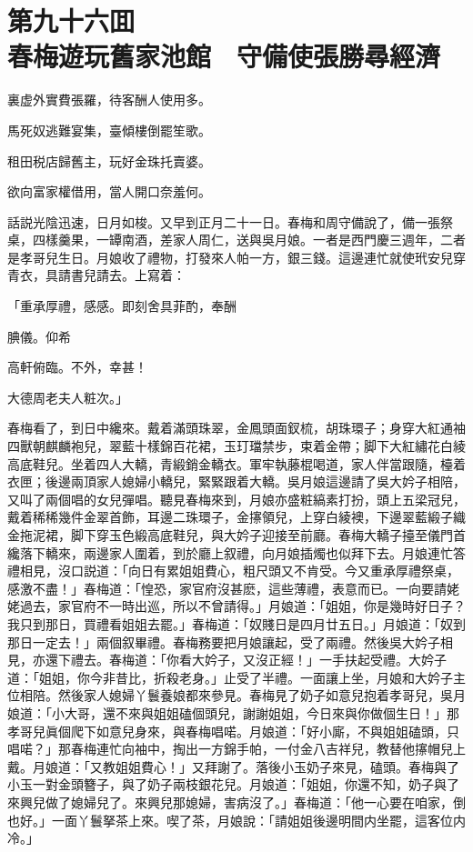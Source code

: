 
\chapter*{第九十六囬　\\春梅遊玩舊家池館　守備使張勝尋經濟}


\begin{myquote}
裏虚外實費張羅，待客酬人使用多。

馬死奴逃難宴集，臺傾樓倒罷笙歌。

租田税店歸舊主，玩好金珠托賣婆。

欲向富家權借用，當人開口奈羞何。
\end{myquote}

話説光陰迅速，日月如梭。又早到正月二十一日。春梅和周守備說了，備一張祭桌，四樣羹果，一罈南酒，差家人周仁，送與吳月娘。一者是西門慶三週年，二者是孝哥兒生日。月娘收了禮物，打發來人帕一方，銀三錢。這邊連忙就使玳安兒穿青衣，具請書兒請去。上寫着：

\begin{myquote}[\markfont]
「重承厚禮，感感。即刻舍具菲酌，奉酬

腆儀。仰希

高軒俯臨。不外，幸甚！


\raggedright{大德周老夫人粧次。」}
\end{myquote}

春梅看了，到日中纔來。戴着滿頭珠翠，金鳳頭面釵梳，胡珠環子；身穿大紅通袖四獸朝麒麟袍兒，翠藍十樣錦百花裙，玉玎璫禁步，束着金帶；脚下大紅繡花白綾高底鞋兒。坐着四人大轎，青緞銷金轎衣。軍牢執藤棍喝道，家人伴當跟隨，檯着衣匣；後邊兩頂家人媳婦小轎兒，緊緊跟着大轎。吳月娘這邊請了吳大妗子相陪，又叫了兩個唱的女兒彈唱。聽見春梅來到，月娘亦盛粧縞素打扮，頭上五梁冠兒，戴着稀稀幾件金翠首飾，耳邊二珠環子，金㩟領兒，上穿白綾襖，下邊翠藍緞子織金拖泥裙，脚下穿玉色緞高底鞋兒，與大妗子迎接至前廳。春梅大轎子擡至儀門首纔落下轎來，兩邊家人圍着，到於廳上叙禮，向月娘插燭也似拜下去。月娘連忙答禮相見，沒口説道：「向日有累姐姐費心，粗尺頭又不肯受。今又重承厚禮祭桌，感激不盡！」春梅道：「惶恐，家官府沒甚麽，這些薄禮，表意而已。一向要請姥姥過去，家官府不一時出巡，所以不曾請得。」月娘道：「姐姐，你是幾時好日子？我只到那日，買禮看姐姐去罷。」春梅道：「奴賤日是四月廿五日。」月娘道：「奴到那日一定去！」兩個叙畢禮。春梅務要把月娘讓起，受了兩禮。然後吳大妗子相見，亦還下禮去。春梅道：「你看大妗子，又沒正經！」一手扶起受禮。大妗子道：「姐姐，你今非昔比，折殺老身。」止受了半禮。一面讓上坐，月娘和大妗子主位相陪。然後家人媳婦丫鬟養娘都來參見。春梅見了奶子如意兒抱着孝哥兒，吳月娘道：「小大哥，還不來與姐姐磕個頭兒，謝謝姐姐，今日來與你做個生日！」那孝哥兒眞個爬下如意兒身來，與春梅唱喏。月娘道：「好小廝，不與姐姐磕頭，只唱喏？」那春梅連忙向袖中，掏出一方錦手帕，一付金八吉祥兒，教替他㩟帽兒上戴。月娘道：「又教姐姐費心！」又拜謝了。落後小玉奶子來見，磕頭。春梅與了小玉一對金頭簪子，與了奶子兩枝銀花兒。月娘道：「姐姐，你還不知，奶子與了來興兒做了媳婦兒了。來興兒那媳婦，害病沒了。」春梅道：「他一心要在咱家，倒也好。」一面丫鬟拏茶上來。喫了茶，月娘說：「請姐姐後邊明間内坐罷，這客位内冷。」

